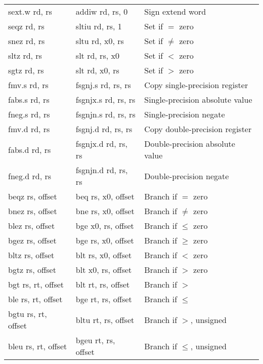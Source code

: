 \begin{tabular}{| l | l | l |}
{\ttfamily sext.w rd, rs} & {\ttfamily addiw rd, rs, 0} & Sign extend word \\
{\ttfamily seqz rd, rs} & {\ttfamily sltiu rd, rs, 1} & Set if $=$ zero \\
{\ttfamily snez rd, rs} & {\ttfamily sltu rd, x0, rs} & Set if $\neq$ zero \\
{\ttfamily sltz rd, rs} & {\ttfamily slt rd, rs, x0} & Set if $<$ zero \\
{\ttfamily sgtz rd, rs} & {\ttfamily slt rd, x0, rs} & Set if $>$ zero \\
\hline
{\ttfamily fmv.s rd, rs} & {\ttfamily fsgnj.s rd, rs, rs} & Copy single-precision register \\
{\ttfamily fabs.s rd, rs} & {\ttfamily fsgnjx.s rd, rs, rs} & Single-precision absolute value \\
{\ttfamily fneg.s rd, rs} & {\ttfamily fsgnjn.s rd, rs, rs} & Single-precision negate \\
{\ttfamily fmv.d rd, rs} & {\ttfamily fsgnj.d rd, rs, rs} & Copy double-precision register \\
{\ttfamily fabs.d rd, rs} & {\ttfamily fsgnjx.d rd, rs, rs} & Double-precision absolute value \\
{\ttfamily fneg.d rd, rs} & {\ttfamily fsgnjn.d rd, rs, rs} & Double-precision negate \\
\hline
{\ttfamily beqz rs, offset} & {\ttfamily beq rs, x0, offset} & Branch if $=$ zero \\
{\ttfamily bnez rs, offset} & {\ttfamily bne rs, x0, offset} & Branch if $\neq$ zero \\
{\ttfamily blez rs, offset} & {\ttfamily bge x0, rs, offset} & Branch if $\leq$ zero \\
{\ttfamily bgez rs, offset} & {\ttfamily bge rs, x0, offset} & Branch if $\geq$ zero \\
{\ttfamily bltz rs, offset} & {\ttfamily blt rs, x0, offset} & Branch if $<$ zero \\
{\ttfamily bgtz rs, offset} & {\ttfamily blt x0, rs, offset} & Branch if $>$ zero \\
\hline
{\ttfamily bgt rs, rt, offset} & {\ttfamily blt rt, rs, offset} & Branch if $>$ \\
{\ttfamily ble rs, rt, offset} & {\ttfamily bge rt, rs, offset} & Branch if $\leq$ \\
{\ttfamily bgtu rs, rt, offset} & {\ttfamily bltu rt, rs, offset} & Branch if $>$, unsigned \\
{\ttfamily bleu rs, rt, offset} & {\ttfamily bgeu rt, rs, offset} & Branch if $\leq$, unsigned \\

\end{tabular}
